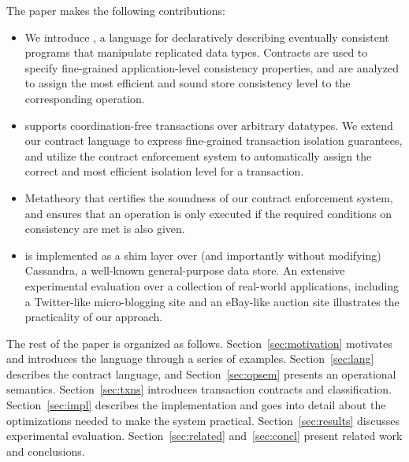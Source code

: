 The paper makes the following contributions:

\begin{itemize}

\item We introduce \name, a language for declaratively describing eventually
  consistent programs that manipulate replicated data types. Contracts are
  used to specify fine-grained application-level consistency properties, and
  are analyzed to assign the most efficient and sound store consistency
  level to the corresponding operation.

\item \name supports coordination-free transactions over arbitrary
  datatypes.  We extend our contract language to express fine-grained
  transaction isolation guarantees, and utilize the contract enforcement
  system to automatically assign the correct and most efficient isolation
  level for a transaction.

\item Metatheory that certifies the soundness of our contract enforcement
  system, and ensures that an operation is only executed if the required
  conditions on consistency are met is also given.

\item \name is implemented as a shim layer over (and importantly without
  modifying) Cassandra, a well-known general-purpose data store.  An
  extensive experimental evaluation over a collection of real-world
  applications, including a Twitter-like micro-blogging site and an
  eBay-like auction site illustrates the practicality of our approach.

\end{itemize}

The rest of the paper is organized as follows. Section~\ref{sec:motivation}
motivates \name and introduces the language through a series of examples.
Section~\ref{sec:lang} describes the contract language, and
Section~\ref{sec:opsem} presents an operational semantics.
Section~\ref{sec:txns} introduces transaction contracts and
classification. Section~\ref{sec:impl} describes the implementation and goes
into detail about the optimizations needed to make the system practical.
Section~\ref{sec:results} discusses experimental evaluation.
Section~\ref{sec:related} and~\ref{sec:concl} present related work and
conclusions.
